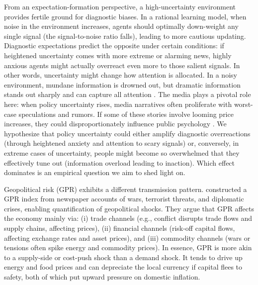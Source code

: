 \documentclass[12pt]{article}
\begin{document}
From an expectation-formation perspective, a high-uncertainty environment provides fertile ground for diagnostic biases. In a rational learning model, when noise in the environment increases, agents should optimally down-weight any single signal (the signal-to-noise ratio falls), leading to more cautious updating. Diagnostic expectations predict the opposite under certain conditions: if heightened uncertainty comes with more extreme or alarming news, highly anxious agents might actually overreact even more to those salient signals. In other words, uncertainty might change how attention is allocated. In a noisy environment, mundane information is drowned out, but dramatic information stands out sharply and can capture all attention \cite[e.g.,][]{Carroll2003}. The media plays a pivotal role here: when policy uncertainty rises, media narratives often proliferate with worst-case speculations and rumors. If some of these stories involve looming price increases, they could disproportionately influence public psychology \cite{Shiller2017}. We hypothesize that policy uncertainty could either amplify diagnostic overreactions (through heightened anxiety and attention to scary signals) or, conversely, in extreme cases of uncertainty, people might become so overwhelmed that they effectively tune out (information overload leading to inaction). Which effect dominates is an empirical question we aim to shed light on.

Geopolitical risk (GPR) exhibits a different transmission pattern. \cite{Caldara2022} constructed a GPR index from newspaper accounts of wars, terrorist threats, and diplomatic crises, enabling quantification of geopolitical shocks. They argue that GPR affects the economy mainly via: (i) trade channels (e.g., conflict disrupts trade flows and supply chains, affecting prices), (ii) financial channels (risk-off capital flows, affecting exchange rates and asset prices), and (iii) commodity channels (wars or tensions often spike energy and commodity prices). In essence, GPR is more akin to a supply-side or cost-push shock than a demand shock. It tends to drive up energy and food prices and can depreciate the local currency if capital flees to safety, both of which put upward pressure on domestic inflation.
\end{document}
